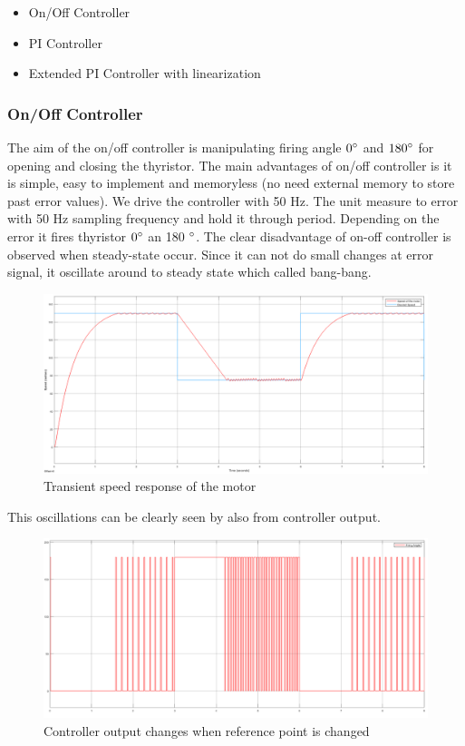 \documentclass[fleqn, a4paper]{report}
\begin{document}
\begin{itemize}
  \item On/Off Controller
  \item PI Controller
  \item Extended PI Controller with linearization
\end{itemize}
\subsubsection*{On/Off Controller}
The aim of the on/off controller is manipulating firing angle $0 \degree$ and $180 \degree$ for opening and closing the thyristor. The main advantages of on/off controller is it is simple, easy to implement and memoryless (no need external memory to store past error values).  We drive the controller with 50 Hz. The unit measure to error with 50 Hz sampling frequency and hold it through period. Depending on the error it fires thyristor $0 \degree$ an 180 $\degree$. 
The clear disadvantage of on-off controller is observed when steady-state occur. Since it can not do small changes at error signal, it oscillate around to steady state which called bang-bang. 
\begin{figure}[H]
    \centering
    \includegraphics[width=10 cm]{on-off-controller.png}
    \caption{Transient speed response of the motor}
    \label{fig:my_label}
\end{figure}
This oscillations can be clearly seen by also from controller output. 
\begin{figure}[H]
    \centering
    \includegraphics[width=10 cm]{Controller_output_onoff.png}
    \caption{Controller output changes when reference point is changed}
    \label{fig:my_label}
\end{figure}
\end{document}
